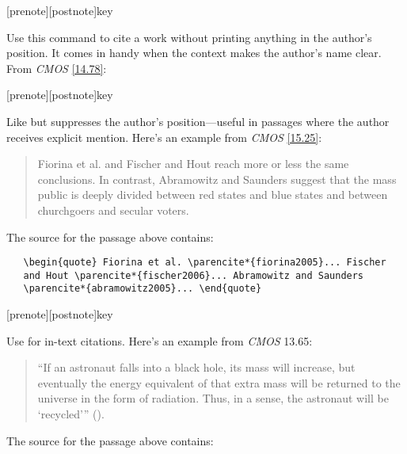 \documentclass[11pt,letterpaper,oneside]{article}
\begin{document}
\begin{ltxsyntax}

[prenote][postnote]{key}

Use this command to cite a work without printing anything in the
author's position. It comes in handy when the context makes the
author's name clear. From \textit{CMOS} \ref{14.78}:

\begin{citebib}
\item \cite*[233]{franklin1868}
\item \cite*[234]{franklin1868}
\end{citebib}

[prenote][postnote]{key}

Like  but suppresses the author's position---useful in
passages where the author receives explicit mention. Here's an example
from \textit{CMOS} \ref{15.25}:

\begin{quote} Fiorina et al. \parencite*{fiorina2005} and Fischer and
Hout \parencite*{fischer2006} reach more or less the same conclusions.
In contrast, Abramowitz and Saunders \parencite*{abramowitz2005}
suggest that the mass public is deeply divided between red states and
blue states and between churchgoers and secular voters. \end{quote}

The source for the passage above contains:

\begin{verbatim}
   \begin{quote} Fiorina et al. \parencite*{fiorina2005}... Fischer
   and Hout \parencite*{fischer2006}... Abramowitz and Saunders
   \parencite*{abramowitz2005}... \end{quote}
\end{verbatim}

[prenote][postnote]{key}

Use  for in-text citations. Here's an example from
\textit{CMOS} 13.65:

\begin{quote} ``If an astronaut falls into a black hole, its mass will
increase, but eventually the energy equivalent of that extra mass will
be returned to the universe in the form of radiation. Thus, in a
sense, the astronaut will be `recycled'''
\mkbibparens{\textcite[112]{hawking1988}}. \end{quote}

The source for the passage above contains:


\end{ltxsyntax}
\end{document}
